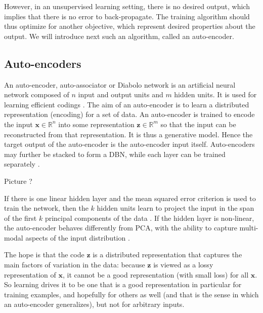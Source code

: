 \documentclass[a4paper,12pt,twoside]{report}
\newcommand{\R}{\mathbb{R}}
\newcommand{\x}{\mathbf{x}}
\newcommand{\z}{\mathbf{z}}
\begin{document}
However, in an unsupervised learning setting, there is no desired output, which implies that there is no error to back-propagate. The training algorithm should thus optimize for another objective, which represent desired properties about the output. We will introduce next such an algorithm, called an auto-encoder.

\subsection{Auto-encoders} \label{sec:auto_encoders}

An auto-encoder, auto-associator or Diabolo network is an artificial neural network composed of $n$ input and output units and $m$ hidden units. It is used for learning efficient codings \cite{bourlard1988autoencoder, hinton1994autoencoder}. The aim of an auto-encoder is to learn a distributed representation (encoding) for a set of data. An auto-encoder is trained to encode the input $\x \in \R^n$ into some representation $\z \in \R^m$ so that the input can be reconstructed from that representation. It is thus a generative model. Hence the target output of the auto-encoder is the auto-encoder input itself. Auto-encoders may further be stacked to form a \gls{DBN}, while each layer can be trained separately \cite{bengio2007DBN, lecun2006stackedSparseAutoencoders}.

{\color{red} Picture ?}

If there is one linear hidden layer and the mean squared error criterion is used to train the network, then the $k$ hidden units learn to project the input in the span of the first $k$ principal components of the data \cite{bourlard1988autoencoder}. If the hidden layer is non-linear, the auto-encoder behaves differently from PCA, with the ability to capture multi-modal aspects of the input distribution \cite{japkowicz2000autoencoderPCA}.

The hope is that the code $\z$ is a distributed representation that captures the main factors of variation in the data: because $\z$ is viewed as a lossy representation of $\x$, it cannot be a good representation (with small loss) for all $\x$. So learning drives it to be one that is a good representation in particular for training examples, and hopefully for others as well (and that is the sense in which an auto-encoder generalizes), but not for arbitrary inputs.
\end{document}
